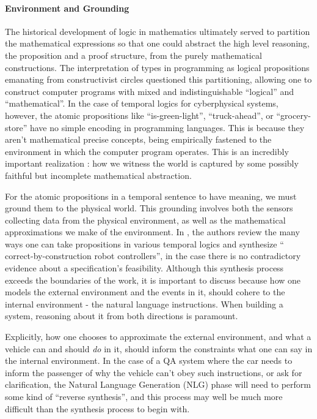 \documentclass{article}
\begin{document}
\paragraph{Environment and Grounding}

The historical development of logic in mathematics ultimately served to
partition the mathematical expressions so that one could abstract the high level
reasoning, the proposition and a proof structure, from the purely mathematical
constructions. The interpretation of types in programming as logical
propositions emanating from constructivist circles questioned this partitioning,
allowing one to construct computer programs with mixed and indistinguishable
``logical'' and ``mathematical''. In the case of temporal logics for
cyberphysical systems, however, the atomic propositions like ``is-green-light'',
``truck-ahead'', or ``grocery-store'' have no simple encoding in programming
languages. This is because they aren't mathematical precise concepts, being
empirically fastened to the environment in which the computer program operates.
This is an incredibly important realization : how we witness the world is
captured by some possibly faithful but incomplete mathematical abstraction.

For the atomic propositions in a temporal sentence to have meaning, we must
ground them to the physical world. This grounding involves both the sensors
collecting data from the physical environment, as well as the mathematical
approximations we make of the environment. In \cite{synthGazit}, the authors
review the many ways one can take propositions in various temporal logics and
synthesize `` correct-by-construction robot controllers'', in the case there is no
contradictory evidence about a specification's feasibility. Although this
synthesis process exceeds the boundaries of the work, it is important to discuss
because how one models the external environment and the events in it, should
cohere to the internal environment - the natural language instructions.
When building a system, reasoning about it from both directions is paramount.

Explicitly, how one chooses to approximate the external environment, and what a
vehicle can and should \emph{do} in it, should inform the constraints what
one can say in the internal environment. In the case of a QA system where the
car needs to inform the passenger of why the vehicle can't obey such
instructions, or ask for clarification, the Natural Language Generation (NLG)
phase will need to perform some kind of ``reverse synthesis'', and this process
may well be much more difficult than the synthesis process to begin with.
\end{document}
